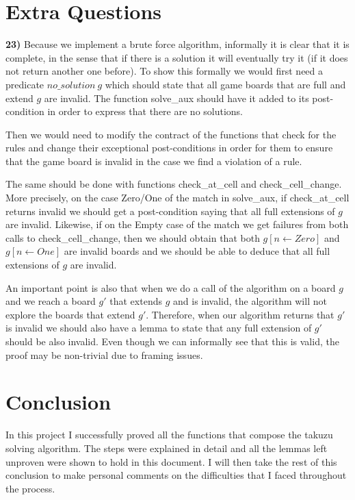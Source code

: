 \documentclass[]{StandardTemplate}
\begin{document}
\section{Extra Questions}
\label{sec:exq}

\textbf{23)} Because we implement a brute force algorithm, informally it is clear that it is complete, in the sense that if there is a solution it will eventually try it (if it does not return another one before). To show this formally we would first need a predicate $ no\_solution~g $ which should state that all game boards that are full and extend $ g $ are invalid. The function solve\_aux should have it added to its post-condition in order to express that there are no solutions.

Then we would need to modify the contract of the functions that check for the rules and change their exceptional post-conditions in order for them to ensure that the game board is invalid in the case we find a violation of a rule.

The same should be done with functions check\_at\_cell and check\_cell\_change. More precisely, on the case Zero/One of the match in solve\_aux, if check\_at\_cell returns invalid we should get a post-condition saying that all full extensions of $ g $ are invalid. Likewise, if on the Empty case of the match we get failures from both calls to check\_cell\_change, then we should obtain that both $ g[n \leftarrow Zero] $ and $ g[n \leftarrow One] $ are invalid boards and we should be able to deduce that all full extensions of $ g $ are invalid.

An important point is also that when we do a call of the algorithm on a board $ g $ and we reach a board $ g' $ that extends $ g $ and is invalid, the algorithm will not explore the boards that extend $ g' $. Therefore, when our algorithm returns that $ g' $ is invalid we should also have a lemma to state that any full extension of $ g' $ should be also invalid. Even though we can informally see that this is valid, the proof may be non-trivial due to framing issues. 

\section{Conclusion}
\label{sec:conc}

In this project I successfully proved all the functions that compose the takuzu solving algorithm. The steps were explained in detail  and all the lemmas left unproven were shown to hold in this document. I will then take the rest of this conclusion to make personal comments on the difficulties that I faced throughout the process.
\end{document}
